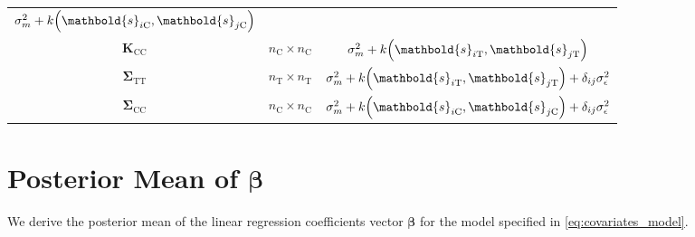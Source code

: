 \documentclass[letter]{article}
\DeclarePairedDelimiter{\parenthesis}{\lparen}{\rparen}
\newcommand{\del}[1]{\parenthesis*{#1}}
\newcommand{\treat}{\mathrm{T}}
\newcommand{\ctrol}{\mathrm{C}}
\newcommand{\sigman}{\sigma_{\epsilon}}
\newcommand{\svec}{\mathbold{s}}
\newcommand{\betavec}{\mathbold{\beta}}
\newcommand{\Kmat}{\mathbold{K}}
\newcommand{\SigmaMat}{\mathbold{\Sigma}}
\newcommand{\STT}{\SigmaMat_{\treat \treat}}
\newcommand{\SCC}{\SigmaMat_{\ctrol \ctrol}}
\newcommand{\KCC}{\Kmat_{\ctrol \ctrol}}
\begin{document}
\begin{longtable}[]{@{}ccc@{}}
\begin{minipage}[t]{0.37\columnwidth}
\(\sigma_m^2 + k\del{\svec_{i\ctrol},\svec_{j\ctrol}}\)\strut
\end{minipage}\tabularnewline
\begin{minipage}[t]{0.24\columnwidth}\centering
\(\KCC\)\strut
\end{minipage} & \begin{minipage}[t]{0.30\columnwidth}\centering
\(n_\ctrol \times n_\ctrol\)\strut
\end{minipage} & \begin{minipage}[t]{0.37\columnwidth}\centering
\(\sigma_m^2 + k\del{\svec_{i\treat},\svec_{j\treat}}\)\strut
\end{minipage}\tabularnewline
\begin{minipage}[t]{0.24\columnwidth}\centering
\(\STT\)\strut
\end{minipage} & \begin{minipage}[t]{0.30\columnwidth}\centering
\(n_\treat \times n_\treat\)\strut
\end{minipage} & \begin{minipage}[t]{0.37\columnwidth}\centering
\(\sigma_m^2 + k\del{\svec_{i\treat},\svec_{j\treat}} + \delta_{ij} \sigman^2\)\strut
\end{minipage}\tabularnewline
\begin{minipage}[t]{0.24\columnwidth}\centering
\(\SCC\)\strut
\end{minipage} & \begin{minipage}[t]{0.30\columnwidth}\centering
\(n_\ctrol \times n_\ctrol\)\strut
\end{minipage} & \begin{minipage}[t]{0.37\columnwidth}\centering
\(\sigma_m^2 + k\del{\svec_{i\ctrol},\svec_{j\ctrol}} + \delta_{ij} \sigman^2\)\strut
\end{minipage}\tabularnewline
\bottomrule
\end{longtable}
    


    	\hypertarget{posterior-mean-of-betavec}{%
\section{\texorpdfstring{Posterior Mean of \(\betavec\)}{Posterior Mean of \textbackslash{}betavec}}\label{posterior-mean-of-betavec}}

\label{sec:betahat}

We derive the posterior mean of the linear regression coefficients vector \(\betavec\) for the model specified in \eqref{eq:covariates_model}.
    
\end{document}
